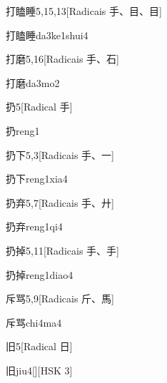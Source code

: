 \begin{entry}{打瞌睡}{5,15,13}[Radicais ⼿、⽬、⽬]
  \begin{phonetics}{打瞌睡}{da3ke1shui4}
  \end{phonetics}
\end{entry}

\begin{entry}{打磨}{5,16}[Radicais ⼿、⽯]
  \begin{phonetics}{打磨}{da3mo2}
  \end{phonetics}
\end{entry}

\begin{entry}{扔}{5}[Radical ⼿]
  \begin{phonetics}{扔}{reng1}
  \end{phonetics}
\end{entry}

\begin{entry}{扔下}{5,3}[Radicais ⼿、⼀]
  \begin{phonetics}{扔下}{reng1xia4}
  \end{phonetics}
\end{entry}

\begin{entry}{扔弃}{5,7}[Radicais ⼿、⼶]
  \begin{phonetics}{扔弃}{reng1qi4}
  \end{phonetics}
\end{entry}

\begin{entry}{扔掉}{5,11}[Radicais ⼿、⼿]
  \begin{phonetics}{扔掉}{reng1diao4}
  \end{phonetics}
\end{entry}

\begin{entry}{斥骂}{5,9}[Radicais ⽄、⾺]
  \begin{phonetics}{斥骂}{chi4ma4}
  \end{phonetics}
\end{entry}

\begin{entry}{旧}{5}[Radical ⽇]
  \begin{phonetics}{旧}{jiu4}[][HSK 3]
  \end{phonetics}
\end{entry}

